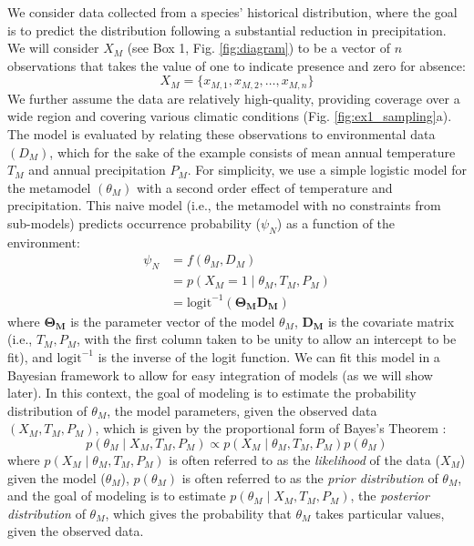 We consider data collected from a species' historical distribution, where the goal is to predict the distribution following a substantial reduction in precipitation. 
We will consider \(X_M\) (see Box 1, Fig. \ref{fig:diagram}) to be a vector of $n$ observations that takes the value of one to indicate presence and zero for absence:
\begin{equation}
X_M = \{x_{M,1}, x_{M,2}, \ldots, x_{M,n}\}
\end{equation}
We further assume the data are relatively high-quality, providing coverage over a wide region and covering various climatic conditions (Fig. \ref{fig:ex1_sampling}a). 
The model is evaluated by relating these observations to environmental data \((D_M)\), which for the sake of the example consists of mean annual temperature $T_M$ and annual precipitation $P_M$. 
For simplicity, we use a simple logistic model for the metamodel \((\theta_M)\) with a second order effect of temperature and precipitation. 
This naive model (i.e., the metamodel with no constraints from sub-models) predicts  occurrence probability (\(\psi_N\)) as a function of the environment:
\begin{equation}
\begin{aligned}
	\psi_N &= f\left(\theta_M, D_M \right) \\
	&= p \left (X_M = 1 \mid \theta_M, T_M, P_M \right) \\
	&=\text{logit}^{-1}\left( \mathbf{\Theta_M} \mathbf{D_M} \right)
\end{aligned}
\end{equation}
where \(\mathbf{\Theta_M}\) is the parameter vector of the model \(\theta_M\), \(\mathbf{D_M} \) is the covariate matrix (i.e., \(T_M, P_M\), with the first column taken to be unity to allow an intercept to be fit), and \(\text{logit}^{-1}\) is the inverse of the logit function.
We can fit this model in a Bayesian framework to allow for easy integration of models (as we will show later).
In this context, the goal of modeling is to estimate the probability distribution of \(\theta_M\), the model parameters, given the observed data \((X_M, T_M, P_M)\), which is given by the proportional form of Bayes's Theorem \citep[for readers unfamiliar with general concepts in Bayesian inference, concise introductions can be found in ][]{McCarthy2007, Link2010}:
\begin{equation}
\label{eq:ex1_bayes}
	p\left (\theta_M \mid X_M,T_M,P_M \right ) \propto 
	p \left(X_M \mid \theta_M, T_M, P_M \right)
	p \left(\theta_M \right)
\end{equation}
where \(p\left(X_M \mid \theta_M, T_M, P_M \right)\) is often referred to as the \emph{likelihood} of the data (\(X_M\)) given the model (\(\theta_M\)), \(p\left(\theta_M \right)\) is often referred to as the \emph{prior distribution} of \(\theta_M\), and the goal of modeling is to estimate \(p\left (\theta_M \mid X_M,T_M,P_M \right )\), the \emph{posterior distribution} of \(\theta_M\), which gives the probability that \(\theta_M\) takes particular values, given the observed data.

